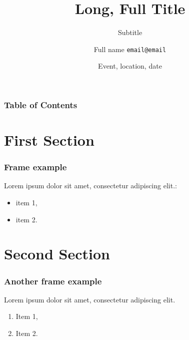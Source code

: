 \documentclass[aspectratio=169]{beamer}
\title[short title]{Long, Full Title}
\subtitle{Subtitle}
\date[Short date]{Event, location, date}
\author[Short name]{Full name
\hspace{0.3cm}\texttt{email@email}}
\begin{document}
\frame{\titlepage}

\begin{frame}
\frametitle{Table of Contents}
\tableofcontents
\end{frame}

\section{First Section}
\begin{frame}
\frametitle{Frame example}
Lorem ipsum dolor sit amet, consectetur adipiscing elit.:
\begin{itemize}
\item item 1,
\item item 2.
\end{itemize}
\end{frame}

\section{Second Section}
\begin{frame}
\frametitle{Another frame example}
Lorem ipsum dolor sit amet, consectetur adipiscing elit.
\begin{enumerate}
\item Item 1,
\item Item 2.
\end{enumerate}
\end{frame}
\end{document}

